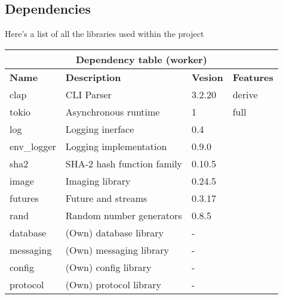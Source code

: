 \documentclass[../documentation.tex]{subfiles}
\begin{document}
\pagebreak

\subsection{Dependencies}

Here's a list of all the libraries used within the project

\bgroup{}
\def\arraystretch{1.5}
\begin{center}
    \begin{tabular}{ |p{2cm}|p{4cm}|p{1.5cm}|p{2cm}| }
        \hline
        \multicolumn{4}{|c|}{\textbf{Dependency table (worker)}} \\
        \hline
        \textbf{Name} & \textbf{Description} & \textbf{Vesion} & \textbf{Features} \\
        \hline
        clap & CLI Parser & 3.2.20 & derive \\
        \hline
        tokio & Asynchronous runtime & 1 & full \\
        \hline
        log & Logging inerface & 0.4 & \\
        \hline
        env\_logger & Logging implementation & 0.9.0 & \\
        \hline
        sha2 & SHA-2 hash function family & 0.10.5 & \\
        \hline
        image & Imaging library & 0.24.5 & \\
        \hline
        futures & Future and streams & 0.3.17 & \\
        \hline
        rand & Random number generators & 0.8.5 & \\
        \hline
        database & (Own) database library & - & \\
        \hline
        messaging & (Own) messaging library & - & \\
        \hline
        config & (Own) config library & - & \\
        \hline
        protocol & (Own) protocol library & - & \\
        \hline
    \end{tabular}
\end{center}
\egroup{}
\end{document}
